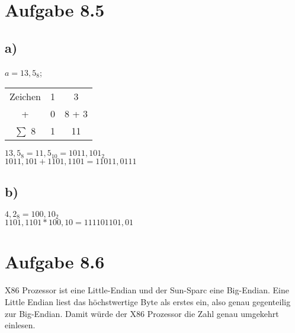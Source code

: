 \documentclass{article}
\begin{document}
	\section*{Aufgabe 8.5}
	\subsection*{a)}
	$a = 13,5_8$; \\
	\begin{tabular}[h]{c|c|c}
		Zeichen & 1 & 3 \\
		+ & 0 & 8 + 3\\
		$\sum$ 8 & 1 & 11
	\end{tabular}
	$13,5_8 = 11,5_{10} = 1011,101_2  $ \\
	$1011,101 + 1101,1101 = 11011,0111$
	\subsection*{b)}
	$4,2_8 = 100,10_2$ \\
	$1101,1101 * 100,10 = 111101101,01$ \\
	
	\section*{Aufgabe 8.6}
	X86 Prozessor ist eine Little-Endian und der Sun-Sparc eine Big-Endian. Eine Little Endian liest das höchstwertige Byte als erstes ein, also genau gegenteilig zur Big-Endian. Damit würde der X86 Prozessor die Zahl genau umgekehrt einlesen.
\end{document}
